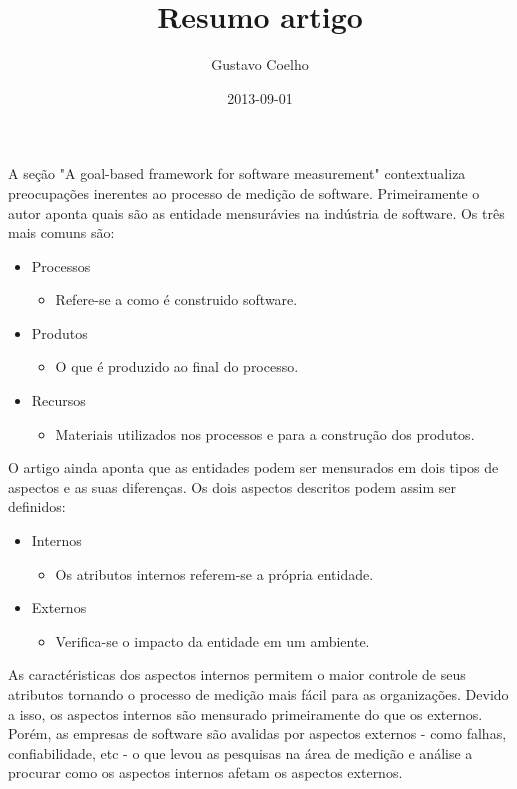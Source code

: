 \documentclass{article}
\title{Resumo artigo}
\date{2013-09-01}
\author{Gustavo Coelho}
\begin{document}



\newpage
A seção "A goal-based framework for software measurement" contextualiza preocupações inerentes ao processo de medição de software. Primeiramente o autor aponta quais são as entidade mensurávies na indústria de software. Os três mais comuns são:
\begin{itemize}
\item    Processos
        \begin{itemize}
        \item[] Refere-se a como é construido software.
        \end{itemize}
\item    Produtos
        \begin{itemize}
        \item[] O que é produzido ao final do processo.
        \end{itemize}
\item    Recursos
        \begin{itemize}
        \item[] Materiais utilizados nos processos e para a construção dos produtos.
        \end{itemize}
\end{itemize}

O artigo ainda aponta que as entidades podem ser mensurados em dois tipos de aspectos e as suas diferenças. Os dois aspectos descritos podem assim ser definidos:
\begin{itemize}
\item   Internos
        \begin{itemize}
        \item[] Os atributos internos referem-se a própria entidade.
        \end{itemize}
\item    Externos 
        \begin{itemize}
        \item[]  Verifica-se o impacto da entidade em um ambiente.
        \end{itemize}
\end{itemize}

As caractéristicas dos aspectos internos permitem o maior controle de seus atributos tornando o processo de medição mais fácil para as organizações. Devido a isso, os aspectos internos são mensurado primeiramente do que os externos. Porém, as empresas de software são avalidas por aspectos externos - como falhas, confiabilidade, etc - o que levou as pesquisas na área de medição e análise a procurar como os aspectos internos afetam os aspectos externos.  
\end{document}

